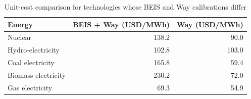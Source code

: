 \begin{table}

\caption{\label{tab:tab_way_unit_cost_compare}Unit-cost comparison for technologies whose BEIS and Way calibrations differ}
\centering
\begin{tabular}[t]{l|r|r}
\hline
Energy & BEIS + Way (USD/MWh) & Way (USD/MWh)\\
\hline
Nuclear & 138.2 & 90.0\\
\hline
Hydro-electricity & 102.8 & 103.0\\
\hline
Coal electricity & 165.8 & 59.4\\
\hline
Biomass electricity & 230.2 & 72.0\\
\hline
Gas electricity & 69.3 & 54.9\\
\hline
\end{tabular}
\end{table}
